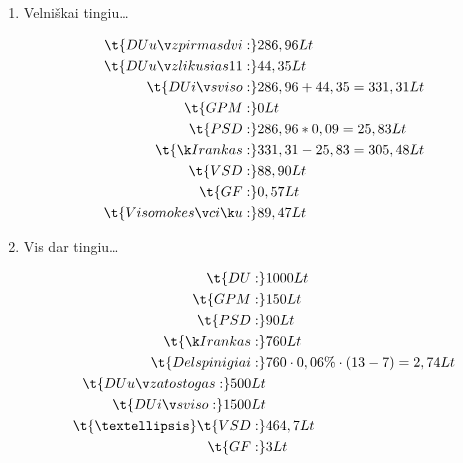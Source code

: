 \begin{enumerate}
  \item Velniškai tingiu…

    \begin{align*}
      \t{DU už pirmas dvi:} & 286,96 Lt \\
      \t{DU už likusias 11:} & 44,35 Lt \\
      \t{DU iš viso:} & 286,96 + 44,35 = 331,31 Lt \\
      \t{GPM:} & 0 Lt \\
      \t{PSD:} & 286,96 * 0,09 = 25,83 Lt \\
      \t{Į rankas:} & 331,31 - 25,83 = 305,48 Lt \\
      \t{VSD:} & 88,90 Lt \\
      \t{GF:} & 0,57 Lt \\
      \t{Viso mokesčių:} & 89,47 Lt \\
    \end{align*}
    
  \item Vis dar tingiu…

    \begin{align*}
      \t{DU:} & 1000 Lt \\
      \t{GPM:} & 150 Lt \\
      \t{PSD:} & 90 Lt \\
      \t{Į rankas:} & 760 Lt \\
      \t{Delspinigiai:} & 760 \cdot 0,06 \% \cdot (13 - 7) = 2,74 Lt \\
      \t{DU už atostogas:} 500 Lt \\
      \t{DU iš viso:} 1500 Lt \\
      \t{…}
      \t{VSD:} & 464,7 Lt \\
      \t{GF:} & 3 Lt \\
    \end{align*}

\end{enumerate}
